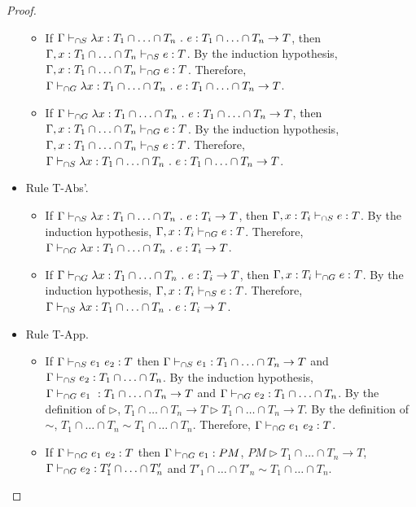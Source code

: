 \documentclass[a4paper]{article}
\begin{document}
\begin{proof}
\begin{itemize}
\begin{itemize}
        \item If $\Gamma \vdash_{\cap S} \lambda x : T_1 \cap \ldots \cap T_n\ .\ e : T_1 \cap \ldots \cap T_n \rightarrow T$, then $\Gamma, x : T_1 \cap \ldots \cap T_n \vdash_{\cap S} e : T$.
        By the induction hypothesis, $\Gamma, x : T_1 \cap \ldots \cap T_n \vdash_{\cap G} e : T$.
        Therefore, $\Gamma \vdash_{\cap G} \lambda x : T_1 \cap \ldots \cap T_n\ .\ e : T_1 \cap \ldots \cap T_n \rightarrow T$.
        \item If $\Gamma \vdash_{\cap G} \lambda x : T_1 \cap \ldots \cap T_n\ .\ e : T_1 \cap \ldots \cap T_n \rightarrow T$, then $\Gamma, x : T_1 \cap \ldots \cap T_n \vdash_{\cap G} e : T$.
        By the induction hypothesis, $\Gamma, x : T_1 \cap \ldots \cap T_n \vdash_{\cap S} e : T$.
        Therefore, $\Gamma \vdash_{\cap S} \lambda x : T_1 \cap \ldots \cap T_n\ .\ e : T_1 \cap \ldots \cap T_n \rightarrow T$.
    \end{itemize}
    \item Rule T-Abs'.
    \begin{itemize}
        \item If $\Gamma \vdash_{\cap S} \lambda x : T_1 \cap \ldots \cap T_n\ .\ e : T_i \rightarrow T$, then $\Gamma, x : T_i \vdash_{\cap S} e : T$.
        By the induction hypothesis, $\Gamma, x : T_i \vdash_{\cap G} e : T$.
        Therefore, $\Gamma \vdash_{\cap G} \lambda x : T_1 \cap \ldots \cap T_n\ .\ e : T_i \rightarrow T$.
        \item If $\Gamma \vdash_{\cap G} \lambda x : T_1 \cap \ldots \cap T_n\ .\ e : T_i \rightarrow T$, then $\Gamma, x : T_i \vdash_{\cap G} e : T$.
        By the induction hypothesis, $\Gamma, x : T_i \vdash_{\cap S} e : T$.
        Therefore, $\Gamma \vdash_{\cap S} \lambda x : T_1 \cap \ldots \cap T_n\ .\ e : T_i \rightarrow T$.
    \end{itemize}
    \item Rule T-App.
    \begin{itemize}
        \item If $\Gamma \vdash_{\cap S} e_1\ e_2 : T$ then $\Gamma \vdash_{\cap S} e_1 : T_1 \cap \ldots \cap T_n \rightarrow T$ and $\Gamma \vdash_{\cap S} e_2 : T_1 \cap \ldots \cap T_n$.
        By the induction hypothesis, $\Gamma \vdash_{\cap G} e_1\ : T_1 \cap \ldots \cap T_n \rightarrow T$ and $\Gamma \vdash_{\cap G} e_2 : T_1 \cap \ldots \cap T_n$.
        By the definition of $\rhd$, $T_1 \cap \ldots \cap T_n \rightarrow T \rhd T_1 \cap \ldots \cap T_n \rightarrow T$.
        By the definition of $\sim$, $T_1 \cap \ldots \cap T_n \sim T_1 \cap \ldots \cap T_n$.
        Therefore, $\Gamma \vdash_{\cap G} e_1\ e_2 : T$.
        \item If $\Gamma \vdash_{\cap G} e_1\ e_2 : T$ then $\Gamma \vdash_{\cap G} e_1 : PM$, $PM \rhd T_1 \cap \ldots \cap T_n \rightarrow T$, $\Gamma \vdash_{\cap G} e_2 : T'_1 \cap \ldots \cap T'_n$ and $T'_1 \cap \ldots \cap T'_n \sim T_1 \cap \ldots \cap T_n$.

\end{itemize}
\end{itemize}
\end{proof}
\end{document}
